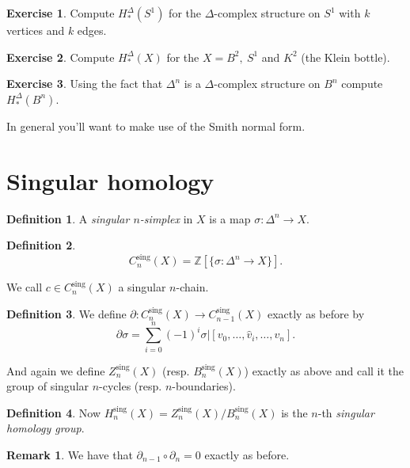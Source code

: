 \documentclass[12pt]{article}
\theoremstyle{definition}
\theoremstyle{definition}
\newtheorem*{defn}{Definition}
\newtheorem*{exer}{Exercise}
\newtheorem*{rmk}{Remark}
\newcommand{\ZZ}{\mathbb{Z}}
\renewcommand{\H}{H_*}
\begin{document}
\begin{exer}
Compute $\H^\Delta (S^1)$ for the $\Delta$-complex structure on $S^1$ with $k$ vertices and $k$ edges.
\end{exer}

\begin{exer}
Compute $\H^\Delta (X)$ for the $X = B^2,\ S^1$ and $K^2$ (the Klein bottle).
\end{exer}

\begin{exer}
Using the fact that $\Delta^n$ is a $\Delta$-complex structure on $B^n$ compute $\H^\Delta (B^n)$.

In general you'll want to make use of the Smith normal form.
\end{exer}

\section{Singular homology}
\begin{defn}
A \emph{singular $n$-simplex} in $X$ is a map $\sigma \colon \Delta^n \to X$.
\end{defn}

\begin{defn}
\[
C_n^{\text{sing}}(X) = \ZZ[\{\sigma\colon \Delta^n \to X\}].\]
\end{defn}

We call $c \in C_n^\text{sing}(X)$ a singular $n$-chain.

\begin{defn}
We define $\partial\colon C_n^\text{sing}(X) \to C_{n-1}^\text{sing}(X)$ exactly as before by
\[\partial \sigma = \sum_{i=0}^{n} (-1)^i \sigma|[v_0,\ldots,\hat{v}_i, \ldots, v_n].\]
\end{defn}

And again we define $Z_n^\text{sing}(X)$ (resp. $B_n^\text{sing}(X)$) exactly as above and call it the group of singular $n$-cycles (resp. $n$-boundaries).

\begin{defn}
Now $H_n^\text{sing}(X) = Z_n^\text{sing}(X)/B_n^\text{sing}(X)$ is the $n$-th \emph{singular homology group}.
\end{defn}

\begin{rmk}
We have that $\partial_{n-1}\circ \partial_n = 0$ exactly as before.
\end{rmk}
\end{document}
